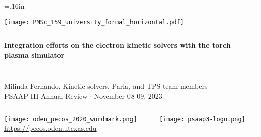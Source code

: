 \documentclass[mathserif, aspectratio=169]{beamer}
\begin{document}


\hoffset=.16in

\begin{frame}[plain,t]{}
\makeatletter
\texttt{[image: PMSc\_159\_university\_formal\_horizontal.pdf]} \newline
\begin{columns}[T,onlytextwidth]
{\bf \color{burntorange} \selectfont 
Integration efforts on the electron kinetic solvers with the torch plasma simulator
}
\end{columns}
\vspace*{.15cm}
\rule{.8\textwidth}{0.6pt} \newline

\vspace*{0.05cm}
{\selectfont
  { \scriptsize
    Milinda Fernando, Kinetic solvers, Parla, and TPS team members \\
  }
  {\color{burntorange} \tiny
    PSAAP III Annual Review $\cdot$ November 08-09, 2023
  }
}

\vspace*{1cm}
\begin{columns}
\begin{column}{0.8\linewidth}
\texttt{[image: oden\_pecos\_2020\_wordmark.png]}\\
{\scriptsize \url{https://pecos.oden.utexas.edu}}
\end{column}

\begin{column}{0.2\linewidth}
\texttt{[image: psaap3-logo.png]}
\end{column}
\end{columns}

\end{frame}
\hoffset=0in
\end{document}
